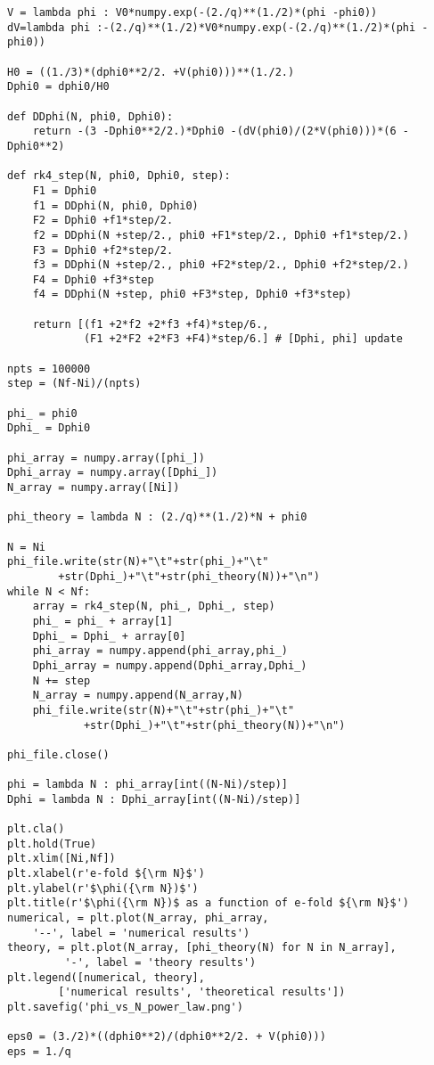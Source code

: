 \documentclass[12pt,a4paper,oneside]{book}
\begin{document}
\begin{appendices}
\begin{small}
\begin{verbatim}
V = lambda phi : V0*numpy.exp(-(2./q)**(1./2)*(phi -phi0))
dV=lambda phi :-(2./q)**(1./2)*V0*numpy.exp(-(2./q)**(1./2)*(phi -phi0))

H0 = ((1./3)*(dphi0**2/2. +V(phi0)))**(1./2.)
Dphi0 = dphi0/H0

def DDphi(N, phi0, Dphi0):
    return -(3 -Dphi0**2/2.)*Dphi0 -(dV(phi0)/(2*V(phi0)))*(6 -Dphi0**2)

def rk4_step(N, phi0, Dphi0, step):
    F1 = Dphi0
    f1 = DDphi(N, phi0, Dphi0)
    F2 = Dphi0 +f1*step/2.
    f2 = DDphi(N +step/2., phi0 +F1*step/2., Dphi0 +f1*step/2.)
    F3 = Dphi0 +f2*step/2.
    f3 = DDphi(N +step/2., phi0 +F2*step/2., Dphi0 +f2*step/2.)
    F4 = Dphi0 +f3*step
    f4 = DDphi(N +step, phi0 +F3*step, Dphi0 +f3*step)  

    return [(f1 +2*f2 +2*f3 +f4)*step/6., 
    		(F1 +2*F2 +2*F3 +F4)*step/6.] # [Dphi, phi] update

npts = 100000
step = (Nf-Ni)/(npts)

phi_ = phi0
Dphi_ = Dphi0

phi_array = numpy.array([phi_])
Dphi_array = numpy.array([Dphi_])
N_array = numpy.array([Ni]) 

phi_theory = lambda N : (2./q)**(1./2)*N + phi0

N = Ni
phi_file.write(str(N)+"\t"+str(phi_)+"\t"
		+str(Dphi_)+"\t"+str(phi_theory(N))+"\n")
while N < Nf:
    array = rk4_step(N, phi_, Dphi_, step)
    phi_ = phi_ + array[1]
    Dphi_ = Dphi_ + array[0]
    phi_array = numpy.append(phi_array,phi_)
    Dphi_array = numpy.append(Dphi_array,Dphi_)
    N += step
    N_array = numpy.append(N_array,N)
    phi_file.write(str(N)+"\t"+str(phi_)+"\t"
    		+str(Dphi_)+"\t"+str(phi_theory(N))+"\n")

phi_file.close()

phi = lambda N : phi_array[int((N-Ni)/step)]
Dphi = lambda N : Dphi_array[int((N-Ni)/step)]

plt.cla()
plt.hold(True)
plt.xlim([Ni,Nf])
plt.xlabel(r'e-fold ${\rm N}$')
plt.ylabel(r'$\phi({\rm N})$')
plt.title(r'$\phi({\rm N})$ as a function of e-fold ${\rm N}$')
numerical, = plt.plot(N_array, phi_array, 
	'--', label = 'numerical results')
theory, = plt.plot(N_array, [phi_theory(N) for N in N_array],
		 '-', label = 'theory results')
plt.legend([numerical, theory], 
		['numerical results', 'theoretical results'])
plt.savefig('phi_vs_N_power_law.png')

eps0 = (3./2)*((dphi0**2)/(dphi0**2/2. + V(phi0)))
eps = 1./q 


\end{verbatim}
\end{small}
\end{appendices}
\end{document}
